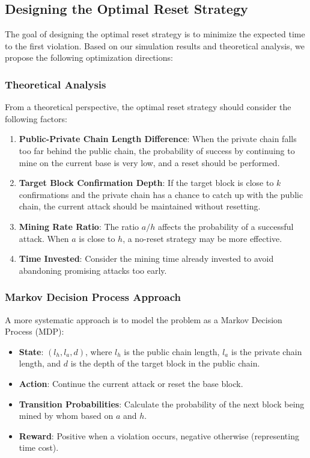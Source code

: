 \documentclass[12pt,a4paper]{article}
\begin{document}
\subsection{Designing the Optimal Reset Strategy}

The goal of designing the optimal reset strategy is to minimize the expected time to the first violation. Based on our simulation results and theoretical analysis, we propose the following optimization directions:

\subsubsection{Theoretical Analysis}

From a theoretical perspective, the optimal reset strategy should consider the following factors:

\begin{enumerate}
    \item \textbf{Public-Private Chain Length Difference}: When the private chain falls too far behind the public chain, the probability of success by continuing to mine on the current base is very low, and a reset should be performed.
    \item \textbf{Target Block Confirmation Depth}: If the target block is close to $k$ confirmations and the private chain has a chance to catch up with the public chain, the current attack should be maintained without resetting.
    \item \textbf{Mining Rate Ratio}: The ratio $a/h$ affects the probability of a successful attack. When $a$ is close to $h$, a no-reset strategy may be more effective.
    \item \textbf{Time Invested}: Consider the mining time already invested to avoid abandoning promising attacks too early.
\end{enumerate}

\subsubsection{Markov Decision Process Approach}

A more systematic approach is to model the problem as a Markov Decision Process (MDP):

\begin{itemize}
    \item \textbf{State}: $(l_h, l_a, d)$, where $l_h$ is the public chain length, $l_a$ is the private chain length, and $d$ is the depth of the target block in the public chain.
    \item \textbf{Action}: Continue the current attack or reset the base block.
    \item \textbf{Transition Probabilities}: Calculate the probability of the next block being mined by whom based on $a$ and $h$.
    \item \textbf{Reward}: Positive when a violation occurs, negative otherwise (representing time cost).
\end{itemize}
\end{document}
